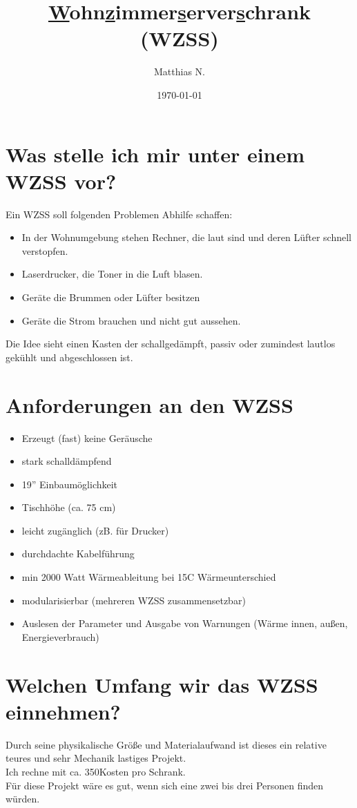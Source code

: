 \documentclass[10pt,a4paper]{article}%
\date{\today}
\author{Matthias N.}
\title{\underline{W}ohn\underline{z}immer\underline{s}erver\underline{s}chrank (WZSS)}
\def\inch#1{#1''}
\begin{document}
\maketitle

\section{Was stelle ich mir unter einem WZSS vor?}
Ein WZSS soll folgenden Problemen Abhilfe schaffen:
\begin{itemize}
\item In der Wohnumgebung stehen Rechner, die laut sind und deren Lüfter schnell verstopfen. 
\item Laserdrucker, die Toner in die Luft blasen.
\item Geräte die Brummen oder Lüfter besitzen
\item Geräte die Strom brauchen und nicht gut aussehen.
 \end{itemize}
Die Idee sieht einen Kasten der schallgedämpft, passiv oder zumindest lautlos gekühlt und abgeschlossen ist.


\section{Anforderungen an den WZSS}

\begin{itemize}
		\item Erzeugt (fast) keine Geräusche
		\item stark schalldämpfend
		\item 1\inch 9   Einbaumöglichkeit
		\item Tischhöhe (ca. 75 cm)
		\item leicht zugänglich (zB. für Drucker)
		\item durchdachte Kabelführung
		\item min 2000 Watt Wärmeableitung bei 15\degree C Wärmeunterschied
		\item modularisierbar (mehreren WZSS zusammensetzbar)
		\item Auslesen der Parameter und Ausgabe von Warnungen (Wärme innen, außen, Energieverbrauch)
\end{itemize}
\section{Welchen Umfang wir das WZSS einnehmen?}
Durch seine physikalische Größe und Materialaufwand ist dieses ein relative teures und sehr Mechanik lastiges Projekt.\\
Ich rechne mit ca. 350\texteuro  { }Kosten pro Schrank.\\ Für diese Projekt wäre es gut, wenn sich eine zwei bis drei Personen finden würden.  


\thispagestyle{empty}
\end{document}
